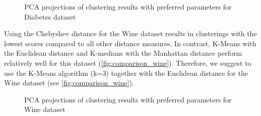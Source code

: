 \begin{figure}[H]
	\centering
	\caption{PCA projections of clustering results with preferred parameters for Diabetes dataset}
	\label{fig:iris_bestparams}
\end{figure}

Using the Chebyshev distance for the Wine dataset results in clusterings with the lowest scores compared to all other distance measures. In contrast, K-Means with the Euclidean distance and K-medians with the Manhattan distance perform relatively well for this dataset (\autoref{fig:comparison_wine}). Therefore, we suggest to use the K-Means algorithm (k=3) together with the Euclidean distance for the Wine dataset (see \autoref{fig:comparison_wine}). 

\begin{figure}[H]
	\centering
	\caption{PCA projections of clustering results with preferred parameters for Wine dataset}
	\label{fig:wine_bestparams}
\end{figure}

